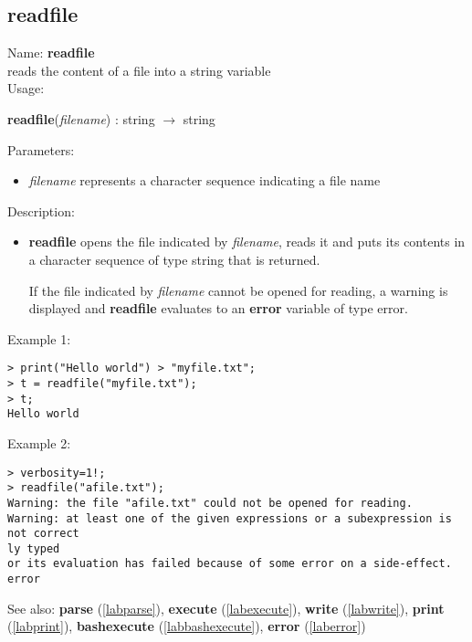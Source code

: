 \subsection{readfile}
\label{labreadfile}
\noindent Name: \textbf{readfile}\\
\phantom{aaa}reads the content of a file into a string variable\\[0.2cm]
\noindent Usage: 
\begin{center}
\textbf{readfile}(\emph{filename}) : \textsf{string} $\rightarrow$ \textsf{string}\\
\end{center}
Parameters: 
\begin{itemize}
\item \emph{filename} represents a character sequence indicating a file name
\end{itemize}
\noindent Description: \begin{itemize}

\item \textbf{readfile} opens the file indicated by \emph{filename}, reads it and puts its
   contents in a character sequence of type \textsf{string} that is returned.
    
   If the file indicated by \emph{filename} cannot be opened for reading, a
   warning is displayed and \textbf{readfile} evaluates to an \textbf{error} variable of
   type \textsf{error}.
\end{itemize}
\noindent Example 1: 
\begin{center}\begin{minipage}{15cm}\begin{Verbatim}[frame=single,commandchars=\\\|\~]
> print("Hello world") > "myfile.txt";
> t = readfile("myfile.txt"); 
> t;
Hello world

\end{Verbatim}
\end{minipage}\end{center}
\noindent Example 2: 
\begin{center}\begin{minipage}{15cm}\begin{Verbatim}[frame=single,commandchars=\\\|\~]
> verbosity=1!;
> readfile("afile.txt");
Warning: the file "afile.txt" could not be opened for reading.
Warning: at least one of the given expressions or a subexpression is not correct
ly typed
or its evaluation has failed because of some error on a side-effect.
error
\end{Verbatim}
\end{minipage}\end{center}
See also: \textbf{parse} (\ref{labparse}), \textbf{execute} (\ref{labexecute}), \textbf{write} (\ref{labwrite}), \textbf{print} (\ref{labprint}), \textbf{bashexecute} (\ref{labbashexecute}), \textbf{error} (\ref{laberror})
